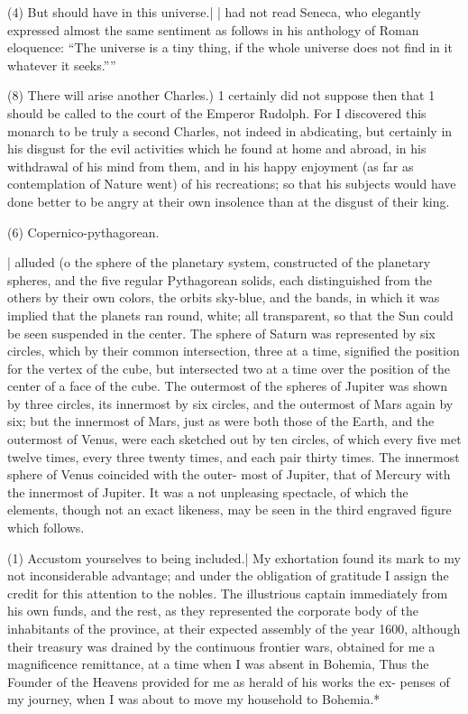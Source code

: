 \documentclass{article}
\begin{document}
{{{{{{{(4) But should have in this universe.| | had not read Seneca, who elegantly expressed almost the same
sentiment as follows in his anthology of Roman eloquence: “The universe is a tiny thing, if the whole
universe does not find in it whatever it seeks.””

(8) There will arise another Charles.) 1 certainly did not suppose then that 1 should be called to the
court of the Emperor Rudolph. For I discovered this monarch to be truly a second Charles, not indeed in
abdicating, but certainly in his disgust for the evil activities which he found at home and abroad, in his
withdrawal of his mind from them, and in his happy enjoyment (as far as contemplation of Nature went)
of his recreations; so that his subjects would have done better to be angry at their own insolence than at
the disgust of their king.

(6) Copernico-pythagorean.} | alluded (o the sphere of the planetary system, constructed of the
planetary spheres, and the five regular Pythagorean solids, each distinguished from the others by their
own colors, the orbits sky-blue, and the bands, in which it was implied that the planets ran round, white;
all transparent, so that the Sun could be seen suspended in the center. The sphere of Saturn was
represented by six circles, which by their common intersection, three at a time, signified the position for
the vertex of the cube, but intersected two at a time over the position of the center of a face of the cube.
The outermost of the spheres of Jupiter was shown by three circles, its innermost by six circles, and the
outermost of Mars again by six; but the innermost of Mars, just as were both those of the Earth, and the
outermost of Venus, were each sketched out by ten circles, of which every five met twelve times, every
three twenty times, and each pair thirty times. The innermost sphere of Venus coincided with the outer-
most of Jupiter, that of Mercury with the innermost of Jupiter. It was a not unpleasing spectacle, of
which the elements, though not an exact likeness, may be seen in the third engraved figure which follows.

(1) Accustom yourselves to being included.| My exhortation found its mark to my not inconsiderable
advantage; and under the obligation of gratitude I assign the credit for this attention to the nobles. The
illustrious captain immediately from his own funds, and the rest, as they represented the corporate body
of the inhabitants of the province, at their expected assembly of the year 1600, although their treasury
was drained by the continuous frontier wars, obtained for me a magnificence remittance, at a time when I
was absent in Bohemia, Thus the Founder of the Heavens provided for me as herald of his works the ex-
penses of my journey, when I was about to move my household to Bohemia.*

}}}}}}
\end{document}
